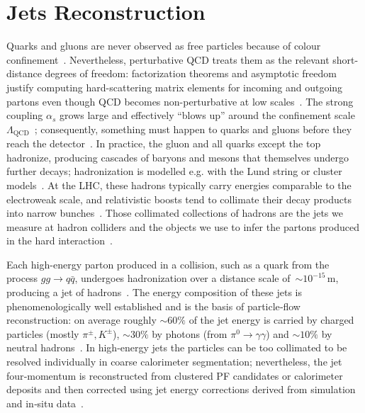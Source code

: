 \section{Jets Reconstruction}\label{sec:jets}

Quarks and gluons are never observed as free particles because of colour confinement~\cite{Andersson:1983,Webber:1984}. Nevertheless, perturbative QCD treats them as the relevant short-distance degrees of freedom: factorization theorems and asymptotic freedom justify computing hard-scattering matrix elements for incoming and outgoing partons even though QCD becomes non-perturbative at low scales~\cite{Collins:1989}. The strong coupling $\alpha_s$ grows large and effectively ``blows up'' around the confinement scale $\Lambda_{\mathrm{QCD}}$~\cite{1674-1137-40-10-100001}; consequently, something must happen to quarks and gluons before they reach the detector~\cite{Sjostrand:2014zea}. In practice, the gluon and all quarks except the top hadronize, producing cascades of baryons and mesons that themselves undergo further decays; hadronization is modelled e.g. with the Lund string or cluster models~\cite{Andersson:1983,Webber:1984,Sjostrand:2014zea}. At the LHC, these hadrons typically carry energies comparable to the electroweak scale, and relativistic boosts tend to collimate their decay products into narrow bunches~\cite{Salam:2010}. Those collimated collections of hadrons are the jets we measure at hadron colliders and the objects we use to infer the partons produced in the hard interaction~\cite{Salam:2010,Cacciari:2008gp}.

Each high-energy parton produced in a collision, such as a quark from the process $gg \rightarrow q\bar{q}$, undergoes hadronization over a distance scale of~$\sim10^{-15}\,\mathrm{m}$, producing a jet of hadrons~\cite{Andersson:1983,Sjostrand:2014zea}. The energy composition of these jets is phenomenologically well established and is the basis of particle‑flow reconstruction: on average roughly $\sim60\%$ of the jet energy is carried by charged particles (mostly $\pi^{\pm}, K^{\pm}$), $\sim30\%$ by photons (from $\pi^0\to\gamma\gamma$) and $\sim10\%$ by neutral hadrons~\cite{CMS:PF2017}. In high-energy jets the particles can be too collimated to be resolved individually in coarse calorimeter segmentation; nevertheless, the jet four‑momentum is reconstructed from clustered PF candidates or calorimeter deposits and then corrected using jet energy corrections derived from simulation and in‑situ data~\cite{CMS:PF2017,Cacciari:2011ma,deFavereau:2013fsa}.

